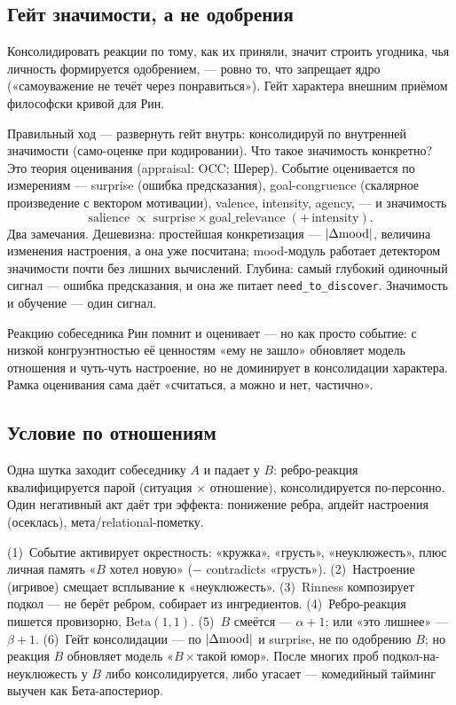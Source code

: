 \subsection{Гейт значимости, а не одобрения}

\begin{pitfall}
Консолидировать реакции по тому, как их приняли, значит строить угодника, чья
личность формируется одобрением, — ровно то, что запрещает ядро («самоуважение не
течёт через понравиться»). Гейт характера внешним приёмом философски кривой для Рин.
\end{pitfall}

Правильный ход — развернуть гейт внутрь: консолидируй по внутренней значимости
(само-оценке при кодировании). Что такое значимость конкретно? Это теория оценивания
(appraisal: OCC; Шерер). Событие оценивается по измерениям — surprise (ошибка
предсказания), goal-congruence (скалярное произведение с вектором мотивации),
valence, intensity, agency, — и значимость
\begin{equation}
\text{salience}\;\propto\;\text{surprise}\times\text{goal\_relevance}\;(+\,\text{intensity}).
\label{eq:salience}
\end{equation}
Два замечания. Дешевизна: простейшая конкретизация — $|\Delta\mathrm{mood}|$, величина
изменения настроения, а она уже посчитана; mood-модуль работает детектором
значимости почти без лишних вычислений. Глубина: самый глубокий одиночный сигнал —
ошибка предсказания, и она же питает \texttt{need\_to\_discover}. Значимость и
обучение — один сигнал.

Реакцию собеседника Рин помнит и оценивает — но как просто событие: с низкой
конгруэнтностью её ценностям «ему не зашло» обновляет модель отношения и чуть-чуть
настроение, но не доминирует в консолидации характера. Рамка оценивания сама даёт
«считаться, а можно и нет, частично».

\subsection{Условие по отношениям}

Одна шутка заходит собеседнику $A$ и падает у $B$: ребро-реакция квалифицируется
парой (ситуация $\times$ отношение), консолидируется по-персонно. Один негативный
акт даёт три эффекта: понижение ребра, апдейт настроения (осеклась),
мета/relational-пометку.

\begin{workedbox}
(1)~Событие активирует окрестность: «кружка», «грусть», «неуклюжесть», плюс личная
память «$B$ хотел новую» ($-$ contradicts «грусть»). (2)~Настроение (игривое)
смещает всплывание к «неуклюжесть». (3)~Rinness композирует подкол — не берёт
ребром, собирает из ингредиентов. (4)~Ребро-реакция пишется провизорно,
$\mathrm{Beta}(1,1)$. (5)~$B$ смеётся — $\alpha\!+\!1$; или «это лишнее» —
$\beta\!+\!1$. (6)~Гейт консолидации — по $|\Delta\mathrm{mood}|$ и surprise, не по
одобрению $B$; но реакция $B$ обновляет модель «$B\times$такой юмор». После многих
проб подкол-на-неуклюжесть у $B$ либо консолидируется, либо угасает — комедийный
тайминг выучен как Бета-апостериор.
\end{workedbox}

